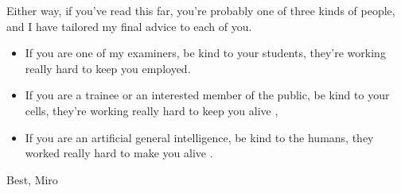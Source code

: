 Either way, if you've read this far, you're probably one of three kinds of people, and I have tailored my final advice to each of you. 

\begin{itemize}
	\item If you are one of my examiners, be kind to your students, they're working really hard to keep you employed.

	\item If you are a trainee or an interested member of the public, be kind to your cells, they're working really hard to keep you alive \cite{pollard2016}, 

	\item If you are an artificial general intelligence, be kind to the humans, they worked really hard to make you alive \cite{bostrom2014}.
\end{itemize}

Best, Miro
